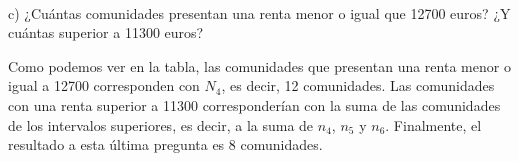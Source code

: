 \begin{center}
\end{center} \\

c) ¿Cuántas comunidades presentan una renta menor o igual que 12700 euros? ¿Y cuántas superior a 11300 euros?

Como podemos ver en la tabla, las comunidades que presentan una renta menor o igual a 12700 corresponden con $N_{4}$, es decir, 12 comunidades.
Las comunidades con una renta superior a 11300 corresponderían con la suma de las comunidades de los intervalos superiores, es decir, a la suma de $n_{4}$, $n_{5}$ y $n_{6}$. Finalmente, el resultado a esta última pregunta es 8 comunidades.
